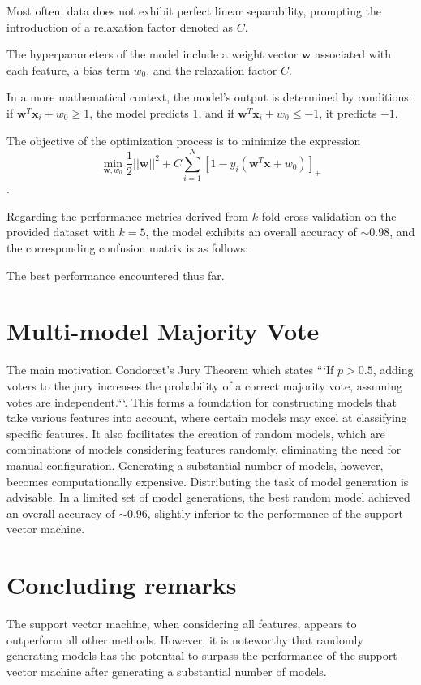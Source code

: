 \documentclass{article}
\begin{document}
Most often, data does not exhibit perfect linear separability, prompting the introduction of a relaxation factor denoted as $C$.

The hyperparameters of the model include a weight vector $\textbf{w}$ associated with each feature, a bias term $w_0$, and the relaxation factor $C$.

In a more mathematical context, the model's output is determined by conditions: if $\textbf{w}^T\textbf{x}_i+w_0\ge 1$, the model predicts $1$, and if $\textbf{w}^T\textbf{x}_i+w_0\le -1$, it predicts $-1$.

The objective of the optimization process is to minimize the expression $$\min_{\textbf{w}, w_0}\frac{1}{2}||\textbf{w}||^2 + C\sum^{N}_{i=1}[1 - y_i(\textbf{w}^T\textbf{x} + w_0)]_{+}$$.

Regarding the performance metrics derived from $k$-fold cross-validation on the provided dataset with $k=5$, the model exhibits an overall accuracy of  $\sim 0.98$, and the corresponding confusion matrix is as follows:

\begin{center}
\end{center}
The best performance encountered thus far.

\section{Multi-model Majority Vote}
The main motivation Condorcet's Jury Theorem which states ```If $p>0.5$, adding voters to the jury increases the probability of a correct majority vote, assuming votes are independent.```. This forms a foundation for constructing models that take various features into account, where certain models may excel at classifying specific features. It also facilitates the creation of random models, which are combinations of models considering features randomly, eliminating the need for manual configuration. Generating a substantial number of models, however, becomes computationally expensive. Distributing the task of model generation is advisable. In a limited set of model generations, the best random model achieved an overall accuracy of  $\sim 0.96$, slightly inferior to the performance of the support vector machine.

\section{Concluding remarks}
The support vector machine, when considering all features, appears to outperform all other methods. However, it is noteworthy that randomly generating models has the potential to surpass the performance of the support vector machine after generating a substantial number of models.
\end{document}
